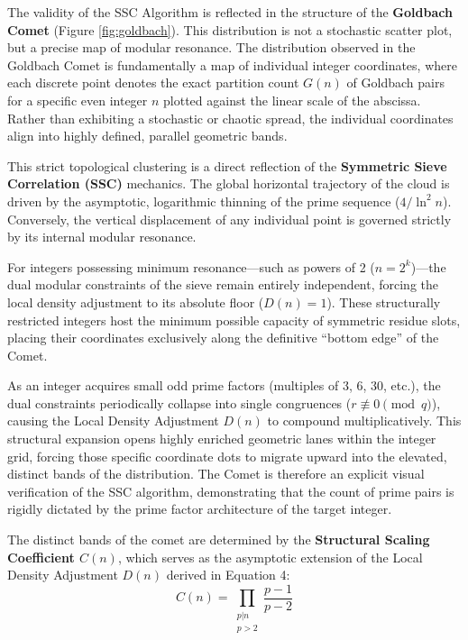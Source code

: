 \documentclass[twoside,9pt]{extarticle}
\begin{document}
The validity of the SSC Algorithm is reflected in the structure of the \textbf{Goldbach Comet} (Figure \ref{fig:goldbach}). This distribution is not a stochastic scatter plot, but a precise map of modular resonance. The distribution observed in the Goldbach Comet is fundamentally a map of individual integer coordinates, where each discrete point denotes the exact partition count $G(n)$ of Goldbach pairs for a specific even integer $n$ plotted against the linear scale of the abscissa. Rather than exhibiting a stochastic or chaotic spread, the individual coordinates align into highly defined, parallel geometric bands. 

This strict topological clustering is a direct reflection of the \textbf{Symmetric Sieve Correlation (SSC)} mechanics. The global horizontal trajectory of the cloud is driven by the asymptotic, logarithmic thinning of the prime sequence ($4/\ln^2 n$). Conversely, the vertical displacement of any individual point is governed strictly by its internal modular resonance. 

For integers possessing minimum resonance—such as powers of 2 ($n = 2^k$)—the dual modular constraints of the sieve remain entirely independent, forcing the local density adjustment to its absolute floor ($D(n) = 1$). These structurally restricted integers host the minimum possible capacity of symmetric residue slots, placing their coordinates exclusively along the definitive ``bottom edge'' of the Comet. 

As an integer acquires small odd prime factors (multiples of 3, 6, 30, etc.), the dual constraints periodically collapse into single congruences ($r \not\equiv 0 \pmod{q}$), causing the Local Density Adjustment $D(n)$ to compound multiplicatively. This structural expansion opens highly enriched geometric lanes within the integer grid, forcing those specific coordinate dots to migrate upward into the elevated, distinct bands of the distribution. The Comet is therefore an explicit visual verification of the SSC algorithm, demonstrating that the count of prime pairs is rigidly dictated by the prime factor architecture of the target integer.

The distinct bands of the comet are determined by the \textbf{Structural Scaling Coefficient $C(n)$}, which serves as the asymptotic extension of the Local Density Adjustment $D(n)$ derived in Equation 4:
\begin{equation}
\label{eq:scaling_coefficient}
C(n) = \prod_{\substack{p|n \\ p>2}} \frac{p-1}{p-2}
\end{equation}
\end{document}
